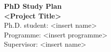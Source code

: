 \vspace*{\fill}
\begin{center}
    {\Large\bf \color{darkerblue} PhD Study Plan}
    \vspace{1.5em}\\
    {\Large\bf \color{darkerblue} <Project Title>}
    \vspace{1.5em}\\
    Ph.D. student: <insert name>
    \vspace{1em}\\
    Programme: <insert programme>
    \vspace{1em}\\
    Supervisor: <insert name>
\end{center}
\vspace*{\fill}
